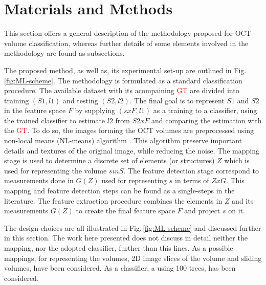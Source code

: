 
\section{Materials and Methods}

  This section offers a general description of the methodology proposed for OCT volume classification, whereas further details of some elements involved in the methodology are found as subsections.
  
  The proposed method, as well as, its experimental set-up are outlined in Fig.\,\ref{fig:ML-scheme}.
  The methodology is formulated as a standard classification procedure.
  The available dataset with its acompaining \textcolor{red}{GT} are divided into training $(S1,l1)$ and testing $(S2,l2)$. 
  The final goal is to represent $S1$ and $S2$ in the feature space $F$ by supplying $(sxF,l1)$ as a training to a classifier, using the trained classifier to estimate $l2$ from $S2xF$ and comparing the estimation with the \textcolor{red}{GT}.
   To do so, the images forming the OCT volumes are preprocessed using non-local means (NL-means) algorithm \cite{buades2005non}. This algorithm preserve important details and textures of the original image, while reducing the noise.
   The mapping stage is used to determine a discrete set of elements (or structures) $Z$  which is used for representing the volume $s  in S$.
   The feature detection stage correspond to measurements done in $G(Z)$ used for representing $s$ in terms of $ZxG$. 
   This mapping and feature detection steps can be found as a single-steps in the literature.
   The feature extraction procedure combines the elements in $Z$ and its measurements $G(Z)$ to create the final feature space $F$ and project $s$ on it.
   
   The design choices are all illustrated in Fig.\,\ref{fig:ML-scheme} and discussed further in this section. The work here presented does not discuss in detail neither the mapping, nor the adopted classifier, further than this lines.
   As a possible mappings, for representing the volumes, 2D image slices of the volume and \color{red}{7x7x7}\color{black} sliding volumes, have been considered. 
   As a classifier, a \color{red}{Random Forest}\color{black} using 100 trees, has been considered.
   

